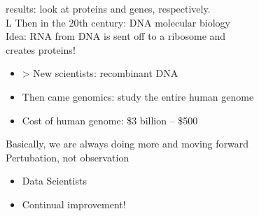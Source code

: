 \documentclass{article}
\begin{document}
results: look at proteins and genes, respectively.\\
L Then in the 20th century: DNA molecular biology\\
Idea: RNA from DNA is sent off to a ribosome and\\
creates proteins!
\begin{itemize}
\item > New scientists: recombinant DNA
\item  Then came genomics: study the entire human genome
\item  Cost of human genome: \$3 billion – \$500
\end{itemize}
Basically, we are always doing more and moving forward\\
Pertubation, not observation
\begin{itemize}
\item  Data Scientists
\item  Continual improvement!
\end{itemize}
\newpage 
\end{document}
